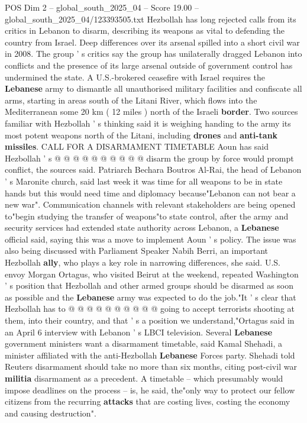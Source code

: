 \begin{textsample}{POS Dim 2 – global\_south\_2025\_04 – Score 19.00 – global\_south\_2025\_04/123393505.txt}
Hezbollah has long rejected calls from its critics in Lebanon to disarm, describing its weapons as vital to defending the country from Israel.
Deep differences over its arsenal spilled into a short civil war in 2008.
The group ' s critics say the group has unilaterally dragged Lebanon into conflicts and the presence of its large arsenal outside of government control has undermined the state.
A U.S.-brokered ceasefire with Israel requires the \textbf{Lebanese} army to dismantle all unauthorised military facilities and confiscate all arms, starting in areas south of the Litani River, which flows into the Mediterranean some 20 km ( 12 miles ) north of the Israeli \textbf{border}.
Two sources familiar with Hezbollah ' s thinking said it is weighing handing to the army its most potent weapons north of the Litani, including \textbf{drones} and \textbf{anti-tank} \textbf{missiles}.
CALL FOR A DISARMAMENT TIMETABLE Aoun has said Hezbollah ' s @ @ @ @ @ @ @ @ @ @ disarm the group by force would prompt conflict, the sources said.
Patriarch Bechara Boutros Al-Rai, the head of Lebanon ' s Maronite church, said last week it was time for all weapons to be in state hands but this would need time and diplomacy because"Lebanon can not bear a new war".
Communication channels with relevant stakeholders are being opened to"begin studying the transfer of weapons"to state control, after the army and security services had extended state authority across Lebanon, a \textbf{Lebanese} official said, saying this was a move to implement Aoun ' s policy.
The issue was also being discussed with Parliament Speaker Nabih Berri, an important Hezbollah \textbf{ally}, who plays a key role in narrowing differences, she said.
U.S. envoy Morgan Ortagus, who visited Beirut at the weekend, repeated Washington ' s position that Hezbollah and other armed groups should be disarmed as soon as possible and the \textbf{Lebanese} army was expected to do the job."It ' s clear that Hezbollah has to @ @ @ @ @ @ @ @ @ @ going to accept terrorists shooting at them, into their country, and that ' s a position we understand,"Ortagus said in an April 6 interview with Lebanon ' s LBCI television.
Several \textbf{Lebanese} government ministers want a disarmament timetable, said Kamal Shehadi, a minister affiliated with the anti-Hezbollah \textbf{Lebanese} Forces party.
Shehadi told Reuters disarmament should take no more than six months, citing post-civil war \textbf{militia} disarmament as a precedent.
A timetable -- which presumably would impose deadlines on the process -- is, he said, the"only way to protect our fellow citizens from the recurring \textbf{attacks} that are costing lives, costing the economy and causing destruction".

\end{textsample}
